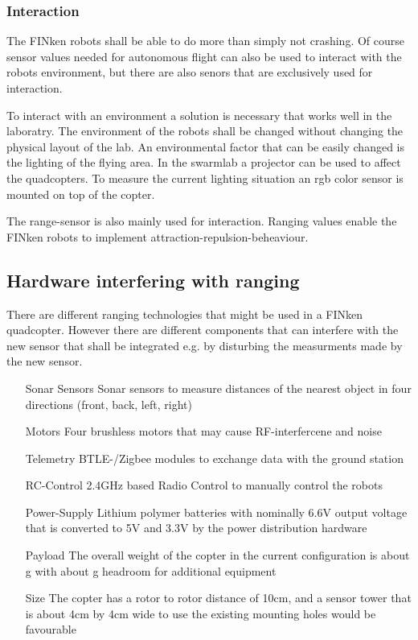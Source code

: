 \subsubsection{Interaction}

The FINken robots shall be able to do more than simply not crashing.
Of course sensor values needed for autonomous flight can also be used to interact with the robots environment, but there are also senors that are exclusively used for interaction.

To interact with an environment a solution is necessary that works well in the laboratry.
The environment of the robots shall be changed without changing the physical layout of the lab.
An environmental factor that can be easily changed is the lighting of the flying area.
In the swarmlab a projector can be used to affect the quadcopters.
To measure the current lighting situation an rgb color sensor is mounted on top of the copter.

The range-sensor is also mainly used for interaction.
Ranging values enable the FINken robots to implement attraction-repulsion-beheaviour.

\subsection{Hardware interfering with ranging}
There are different ranging technologies that might be used in a FINken quadcopter.
However there are different components that can interfere with the new sensor that shall be integrated e.g. by disturbing the measurments made by the new sensor.

\begin{itemize}
	\item[Sonar Sensors] Sonar sensors to measure distances of the nearest object in four directions (front, back, left, right)
	\item[Motors] Four brushless motors that may cause RF-interfercene and noise
	\item[Telemetry] BTLE-/Zigbee modules to exchange data with the ground station
	\item[RC-Control] 2.4GHz based Radio Control to manually control the robots
	\item[Power-Supply] Lithium polymer batteries with nominally 6.6V  output voltage that is converted to 5V and 3.3V by the power distribution hardware
	\item[Payload] The overall weight of the copter in the current configuration is about g with about g headroom for additional equipment
	\item[Size] The copter has a rotor to rotor distance of 10cm, and a sensor tower that is about 4cm by 4cm wide to use the existing mounting holes would be favourable
\end{itemize}

